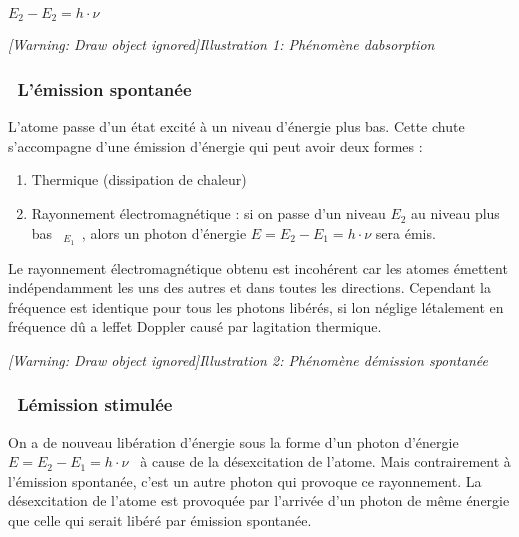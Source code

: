 \documentclass[12pt,twoside]{article}
\newcommand\textsubscript[1]{\ensuremath{{}_{\text{#1}}}}
\newcommand\liststyleLiii{%
\renewcommand\labelitemi{[25CF?]}
\renewcommand\labelitemii{[25CB?]}
\renewcommand\labelitemiii{[25A0?]}
\renewcommand\labelitemiv{[25CF?]}
}
\begin{document}
{\centering\bfseries
 $E_{2}-E_{2}=h\cdot \nu $ 
\par}

{\centering\bfseries
\begin{minipage}{7.753cm}
{\itshape
[Warning: Draw object ignored]Illustration 1: Ph\'enom\`ene
d{\textquotesingle}absorption}
\end{minipage}
\par}

\subsubsection[\ L'\'emission spontan\'ee ]{\ L'\'emission spontan\'ee }
L'atome passe d'un \'etat excit\'e \`a un niveau d'\'energie plus bas.
Cette chute s'accompagne d'une \'emission d'\'energie qui peut avoir
deux formes :

\liststyleLiii
\begin{enumerate}
\item Thermique (dissipation de chaleur)
\item Rayonnement \'electromagn\'etique : si on passe d'un niveau
$E_{2}$ au niveau plus bas \textsubscript{ $E_{1}$ }, alors un photon
d'\'energie  $E=E_{2}-E_{1}=h\cdot \nu $ sera \'emis.
\end{enumerate}
Le rayonnement \'electromagn\'etique obtenu est incoh\'erent car les
atomes \'emettent ind\'ependamment les uns des autres et dans toutes
les directions. Cependant la fr\'equence est identique pour tous les
photons lib\'er\'es, si l{\textquotesingle}on n\'eglige
l{\textquotesingle}\'etalement en fr\'equence d\^u a
l{\textquotesingle}effet \foreignlanguage{english}{Doppler} caus\'e par
l{\textquotesingle}agitation thermique.

{\centering
\begin{minipage}{7.753cm}
{\itshape
[Warning: Draw object ignored]Illustration 2: Ph\'enom\`ene
d{\textquotesingle}\'emission spontan\'ee}
\end{minipage}
\par}

\subsubsection[\ L{\textquotesingle}\'emission
stimul\'ee]{\ L{\textquotesingle}\'emission stimul\'ee}
On a de nouveau lib\'eration d'\'energie sous la forme d'un photon
d'\'energie $E=E_{2}-E_{1}=h\cdot \nu $ \textsubscript{ }\`a cause de
la d\'esexcitation de l'atome. Mais contrairement \`a l'\'emission
spontan\'ee, c'est un autre photon qui provoque ce rayonnement. La
d\'esexcitation de l'atome est provoqu\'ee par l'arriv\'ee d'un photon
de m\^eme \'energie que celle qui serait lib\'er\'e par \'emission
spontan\'ee.
\end{document}
